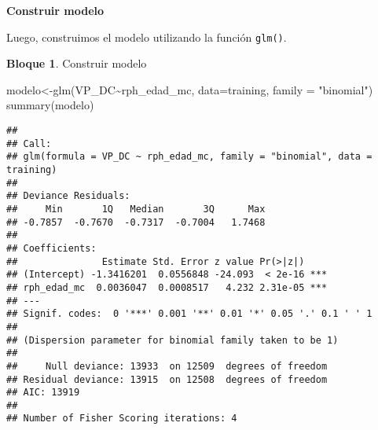 \documentclass[
]{book}
\newenvironment{Shaded}{\begin{snugshade}}{\end{snugshade}}
\newcommand{\AttributeTok}[1]{\textcolor[rgb]{0.77,0.63,0.00}{#1}}
\newcommand{\DecValTok}[1]{\textcolor[rgb]{0.00,0.00,0.81}{#1}}
\newcommand{\FunctionTok}[1]{\textcolor[rgb]{0.00,0.00,0.00}{#1}}
\newcommand{\NormalTok}[1]{#1}
\newcommand{\OtherTok}[1]{\textcolor[rgb]{0.56,0.35,0.01}{#1}}
\newcommand{\SpecialCharTok}[1]{\textcolor[rgb]{0.00,0.00,0.00}{#1}}
\newcommand{\StringTok}[1]{\textcolor[rgb]{0.31,0.60,0.02}{#1}}
\theoremstyle{definition}
\theoremstyle{definition}
\newtheorem{example}{Bloque}[chapter]
\theoremstyle{definition}
\theoremstyle{definition}
\theoremstyle{remark}
\begin{document}
\begin{Shaded}
\end{Shaded}

\textbf{Construir modelo}

Luego, construimos el modelo utilizando la función \texttt{glm()}.

\begin{example}
\protect\hypertarget{exm:bloque82nbm}{}\label{exm:bloque82nbm}Construir modelo
\end{example}

\begin{Shaded}
\begin{Highlighting}[]
\NormalTok{modelo}\OtherTok{\textless{}{-}}\FunctionTok{glm}\NormalTok{(VP\_DC}\SpecialCharTok{\textasciitilde{}}\NormalTok{rph\_edad\_mc, }
            \AttributeTok{data=}\NormalTok{training, }
            \AttributeTok{family =} \StringTok{"binomial"}\NormalTok{)}
\FunctionTok{summary}\NormalTok{(modelo)}
\end{Highlighting}
\end{Shaded}

\begin{verbatim}
## 
## Call:
## glm(formula = VP_DC ~ rph_edad_mc, family = "binomial", data = training)
## 
## Deviance Residuals: 
##     Min       1Q   Median       3Q      Max  
## -0.7857  -0.7670  -0.7317  -0.7004   1.7468  
## 
## Coefficients:
##               Estimate Std. Error z value Pr(>|z|)    
## (Intercept) -1.3416201  0.0556848 -24.093  < 2e-16 ***
## rph_edad_mc  0.0036047  0.0008517   4.232 2.31e-05 ***
## ---
## Signif. codes:  0 '***' 0.001 '**' 0.01 '*' 0.05 '.' 0.1 ' ' 1
## 
## (Dispersion parameter for binomial family taken to be 1)
## 
##     Null deviance: 13933  on 12509  degrees of freedom
## Residual deviance: 13915  on 12508  degrees of freedom
## AIC: 13919
## 
## Number of Fisher Scoring iterations: 4
\end{verbatim}
\end{document}
